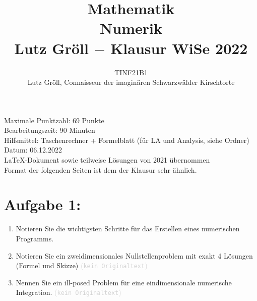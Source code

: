\documentclass[12pt]{article}
\title{Mathematik \rom{3} \\ Numerik \\ Lutz Gröll $-$ Klausur WiSe 2022}
\author{TINF21B1 \\ Lutz Gröll, Connaisseur der imaginären Schwarzwälder Kirschtorte}
\newcommand{\kommentarMacro}[1]{\textcolor{lightgray}{(\texttt{#1})}}
\begin{document}
\maketitle

\begin{center}
	\large
	\vspace*{7cm}
	Maximale Punktzahl: 69 Punkte\\
	\vspace*{1cm}
	Bearbeitungszeit: 90 Minuten\\
	\vspace*{1cm}
	Hilfsmittel: Taschenrechner + Formelblatt (für LA und Analysis, siehe Ordner)\\
	\vspace*{1cm}
	Datum: 06.12.2022\\
	\vspace*{1cm}
	\small \LaTeX-Dokument sowie teilweise Lösungen von 2021 übernommen \\Format der folgenden Seiten ist dem der Klausur sehr ähnlich.\\
\end{center}
\pagebreak



\section*{Aufgabe 1:}
\begin{enumerate}
	\item Notieren Sie die wichtigsten Schritte für das Erstellen eines numerischen Programms.

	      \vspace{9cm}

	\item Notieren Sie ein zweidimensionales Nullstellenproblem mit exakt 4 Lösungen (Formel und Skizze) \kommentarMacro{kein Originaltext}

	      \vspace{4cm}

	\item Nennen Sie ein ill-posed Problem für eine eindimensionale numerische Integration. \kommentarMacro{kein Originaltext}

\end{enumerate}
\pagebreak

\newcommand{\spaltensummennorm}[1]{||#1||_{1}}
\newcommand{\zeilensummennorm}[1]{||#1||_{\infty}}
\newcommand{\realVector}[2]{#1\in \mathbb{R}^{#2}}
\newcommand{\realMatrix}[3]{#1\in \mathbb{R}^{#2\times #3}}
\newcommand{\indentTab}{\hphantom{~~~~}}
\end{document}

